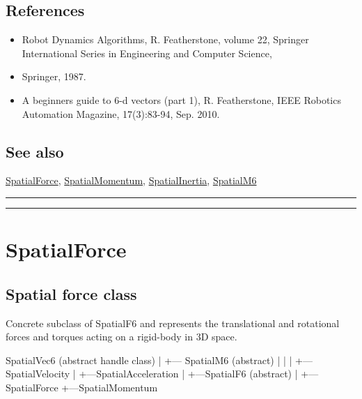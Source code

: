 \subsection*{References}
\begin{itemize}
  \item Robot Dynamics Algorithms, R. Featherstone, volume 22,     Springer International Series in Engineering and Computer Science,
  \item Springer, 1987.
  \item A beginner\textquotesingle s guide to 6-d vectors (part 1), R. Featherstone,     IEEE Robotics Automation Magazine, 17(3):83-94, Sep. 2010.
\end{itemize}

\subsection*{See also}


\hyperlink{SpatialForce}{\color{blue} SpatialForce}, \hyperlink{SpatialMomentum}{\color{blue} SpatialMomentum}, \hyperlink{SpatialInertia}{\color{blue} SpatialInertia}, \hyperlink{SpatialM6}{\color{blue} SpatialM6}

\vspace{1.5ex}\hrule
\vspace{1.5ex}\rule{\textwidth}{1mm}

\hypertarget{SpatialForce}{\section*{SpatialForce}}
\subsection*{Spatial force class}


Concrete subclass of SpatialF6 and represents the
translational and rotational forces and torques acting on a rigid-body in 3D space.

\begin{Code}
    SpatialVec6 (abstract handle class)
      |
      +--- SpatialM6 (abstract)
      |     |
      |     +---SpatialVelocity
      |     +---SpatialAcceleration
      |
      +---SpatialF6 (abstract)
           |
           +---SpatialForce
           +---SpatialMomentum

\end{Code}


